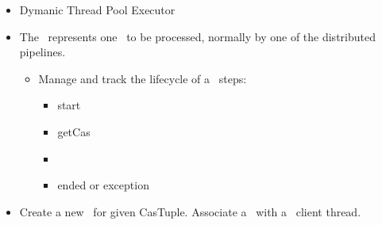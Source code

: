 \begin{itemize}
\begin{itemize}
      \item{Dymanic Thread Pool Executor}
            
      \item{\varWorkItem}
        \begin{description}
        The \varWorkItem~represents one \varCAS~to be processed, normally by one of the
        distributed \varUIMA pipelines.
          \begin{itemize}
            \item Manage and track the lifecycle of a \varWorkItem~steps:
              \begin{itemize}
                \item start
                \item getCas
                \item \varSendAndReceiveCAS
                \item ended or exception
              \end{itemize}    
          \end{itemize}    
        \end{description}     
      
      \item{\varWorkItem}
        \begin{description}
        Create a new \varWorkItem~for given CasTuple.
        Associate a \varWorkItem~with a \varUIMAAS~client thread.
        \end{description}  
      

\end{itemize}
\end{itemize}
